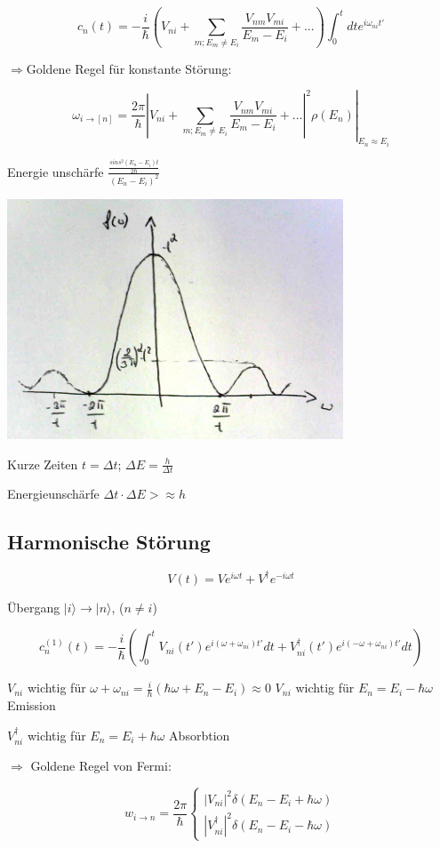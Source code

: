 \[ c_n(t) = -\frac{i}{\hbar} (V_{ni} +\sum_{m; E_m\neq E_i} \frac{ V_{nm}V_{mi} }{E_m-E_i} +...)\int_0^t dt e^{i\omega_{ni}t'} \]

\(\Rightarrow \)Goldene Regel für konstante Störung:

\[\omega_{i\rightarrow [n]} =\left. \frac{2\pi}{\hbar} |V_{ni} +\sum_{m; E_m\neq E_i} \frac{ V_{nm}V_{mi} }{E_m-E_i} +...|^2\rho(E_n)\right|_{E_n\approx E_i} \]

Energie unschärfe \(\frac{\frac{sins^2(E_n-E_i)t}{2\hbar}}{(E_n-E_i)^2}\)

\includegraphics[width=0.75\textwidth]{kap03_07.png}

Kurze Zeiten \(t=\Delta t\); \(\Delta E = \frac{h}{\Delta t}\)

Energieunschärfe \(\Delta t \cdot \Delta E >\approx h\)

\subsection{Harmonische Störung}

\[ V(t) = V e^{i\omega t}+V^\dagger e^{-i\omega t}\]

Übergang \(|i\rangle \rightarrow |n\rangle \), (\(n\neq i\))


\[c^{(1)}_n(t) = -\frac{i}{\hbar} (\int_0^t V_{ni}(t') e^{i(\omega+\omega_{ni})t'}dt + V^{\dagger}_{ni}(t') e^{i(-\omega+\omega_{ni})t'}dt)\]

\(V_{ni}\) wichtig für \(\omega + \omega_{ni} = \frac{i}{\hbar}(\hbar \omega +E_n-E_i)\approx 0\) \(V_{ni}\) wichtig für \(E_n = E_i -\hbar \omega\) Emission

\(V^\dagger_{ni}\) wichtig für \(E_n = E_i +\hbar\omega\) Absorbtion

\(\Rightarrow \) Goldene Regel von Fermi:

\[\boxed{ w_{i\rightarrow n} = \frac{2\pi}{\hbar} \begin{cases}
    |V_{ni}|^2 \delta(E_n-E_i+\hbar\omega) \\
    |V^\dagger_{ni}|^2 \delta(E_n-E_i-\hbar\omega)
  \end{cases}}\]





